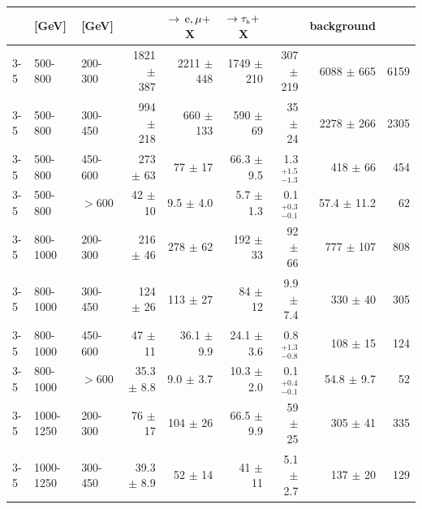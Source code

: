 \begin{table}[!t]
{\begin{tabular}{lll|r|r|r|r|r|r}
      \NJets{} & \HT{} [GeV] &\MHT{} [GeV]
      & \multicolumn{1}{c|}{} 
      & \multicolumn{1}{c|}{$\to \,\text{e},\mu+$X}
      & \multicolumn{1}{c|}{$\to \tau_{\mbox{\tiny h}}+$X}  
      & \multicolumn{1}{c|}{}
      & \multicolumn{1}{c|}{background}  
      & \multicolumn{1}{c}{}  \\ 
      \hline
      3-5     & 500-800    & 200-300  & 1821   $\pm$  387         & 2211   $\pm$  448        &1749   $\pm$  210        & 307  $\pm$  219         & 6088   $\pm$  665      &  6159  \\
      3-5     & 500-800    & 300-450  &  994   $\pm$  218         &  660   $\pm$  133        & 590   $\pm$   69        & 35   $\pm$   24         & 2278   $\pm$  266      &  2305  \\
      3-5     & 500-800    & 450-600  &  273   $\pm$   63         &   77   $\pm$   17        &  66.3 $\pm$   9.5       &  1.3 $^{+1.5}_{-1.3}$       & 418    $\pm$   66      &   454  \\
      3-5     & 500-800    & $>600$   &   42   $\pm$   10         &   9.5 $\pm$    4.0       &   5.7 $\pm$   1.3       &  0.1 $^{+0.3}_{-0.1}$       & 57.4   $\pm$   11.2    &    62  \\ \hline
      3-5     & 800-1000   & 200-300  &  216   $\pm$   46         &  278   $\pm$   62        & 192   $\pm$   33        & 92   $\pm$   66         & 777    $\pm$  107      &   808  \\
      3-5     & 800-1000   & 300-450  &  124   $\pm$   26         &  113   $\pm$   27        &  84   $\pm$   12        &  9.9 $\pm$    7.4       & 330    $\pm$   40      &   305  \\
      3-5     & 800-1000   & 450-600  &   47   $\pm$   11         &   36.1 $\pm$    9.9      &  24.1 $\pm$    3.6      &  0.8 $^{+1.3}_{-0.8}$       & 108    $\pm$   15      &   124  \\
      3-5     & 800-1000   & $>600$   &   35.3 $\pm$    8.8       &    9.0 $\pm$    3.7      &  10.3 $\pm$    2.0      &  0.1 $^{+0.4}_{-0.1}$       & 54.8   $\pm$   9.7     &    52  \\ \hline
      3-5     & 1000-1250  & 200-300  &   76   $\pm$   17         &  104   $\pm$   26        &  66.5 $\pm$    9.9      & 59   $\pm$   25         & 305    $\pm$   41      &   335  \\
      3-5     & 1000-1250  & 300-450  &   39.3 $\pm$    8.9       &   52   $\pm$   14        &  41   $\pm$   11        &  5.1 $\pm$    2.7       & 137    $\pm$   20      &   129  \\

\end{tabular}}
\end{table}
